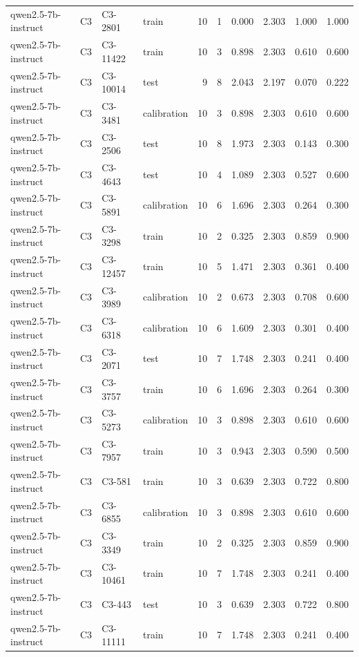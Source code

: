 \begin{table}
\begin{tabular}{llllrrrrrr}
qwen2.5-7b-instruct & C3 & C3-2801 & train & 10 & 1 & 0.000 & 2.303 & 1.000 & 1.000 \\
qwen2.5-7b-instruct & C3 & C3-11422 & train & 10 & 3 & 0.898 & 2.303 & 0.610 & 0.600 \\
qwen2.5-7b-instruct & C3 & C3-10014 & test & 9 & 8 & 2.043 & 2.197 & 0.070 & 0.222 \\
qwen2.5-7b-instruct & C3 & C3-3481 & calibration & 10 & 3 & 0.898 & 2.303 & 0.610 & 0.600 \\
qwen2.5-7b-instruct & C3 & C3-2506 & test & 10 & 8 & 1.973 & 2.303 & 0.143 & 0.300 \\
qwen2.5-7b-instruct & C3 & C3-4643 & test & 10 & 4 & 1.089 & 2.303 & 0.527 & 0.600 \\
qwen2.5-7b-instruct & C3 & C3-5891 & calibration & 10 & 6 & 1.696 & 2.303 & 0.264 & 0.300 \\
qwen2.5-7b-instruct & C3 & C3-3298 & train & 10 & 2 & 0.325 & 2.303 & 0.859 & 0.900 \\
qwen2.5-7b-instruct & C3 & C3-12457 & train & 10 & 5 & 1.471 & 2.303 & 0.361 & 0.400 \\
qwen2.5-7b-instruct & C3 & C3-3989 & calibration & 10 & 2 & 0.673 & 2.303 & 0.708 & 0.600 \\
qwen2.5-7b-instruct & C3 & C3-6318 & calibration & 10 & 6 & 1.609 & 2.303 & 0.301 & 0.400 \\
qwen2.5-7b-instruct & C3 & C3-2071 & test & 10 & 7 & 1.748 & 2.303 & 0.241 & 0.400 \\
qwen2.5-7b-instruct & C3 & C3-3757 & train & 10 & 6 & 1.696 & 2.303 & 0.264 & 0.300 \\
qwen2.5-7b-instruct & C3 & C3-5273 & calibration & 10 & 3 & 0.898 & 2.303 & 0.610 & 0.600 \\
qwen2.5-7b-instruct & C3 & C3-7957 & train & 10 & 3 & 0.943 & 2.303 & 0.590 & 0.500 \\
qwen2.5-7b-instruct & C3 & C3-581 & train & 10 & 3 & 0.639 & 2.303 & 0.722 & 0.800 \\
qwen2.5-7b-instruct & C3 & C3-6855 & calibration & 10 & 3 & 0.898 & 2.303 & 0.610 & 0.600 \\
qwen2.5-7b-instruct & C3 & C3-3349 & train & 10 & 2 & 0.325 & 2.303 & 0.859 & 0.900 \\
qwen2.5-7b-instruct & C3 & C3-10461 & train & 10 & 7 & 1.748 & 2.303 & 0.241 & 0.400 \\
qwen2.5-7b-instruct & C3 & C3-443 & test & 10 & 3 & 0.639 & 2.303 & 0.722 & 0.800 \\
qwen2.5-7b-instruct & C3 & C3-11111 & train & 10 & 7 & 1.748 & 2.303 & 0.241 & 0.400 \\

\end{tabular}
\end{table}
